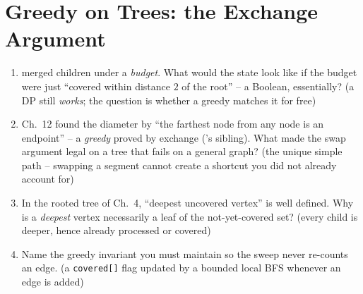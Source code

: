 \section{Greedy on Trees: the Exchange Argument}{\label{sec:c27-greedy}}

\begin{previouslybox}
\begin{enumerate}[nosep, leftmargin=1.6em]
  \item {} merged children under a \emph{budget}. What would
        the state look like if the budget were just ``covered within distance
        $2$ of the root'' -- a Boolean, essentially? (a DP still \emph{works};
        the question is whether a greedy matches it for free)
  \item Ch.~12 found the diameter by ``the farthest node from any node is an
        endpoint'' -- a \emph{greedy} proved by exchange ('s
        sibling). What made the swap argument legal on a tree that fails on a
        general graph? (the unique simple path -- swapping a segment cannot
        create a shortcut you did not already account for)
  \item In the rooted tree of Ch.~4, ``deepest uncovered vertex'' is well
        defined. Why is a \emph{deepest} vertex necessarily a leaf of the
        not-yet-covered set? (every child is deeper, hence already processed or
        covered)
  \item Name the greedy invariant you must maintain so the sweep never
        re-counts an edge. (a \lstinline{covered[]} flag updated by a bounded
        local BFS whenever an edge is added)
\end{enumerate}
\end{previouslybox}


